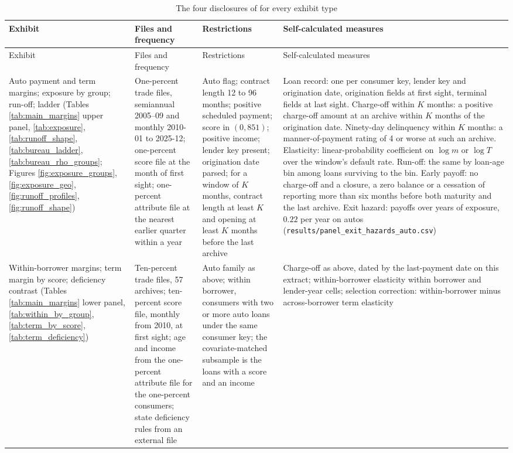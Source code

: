 \begingroup
\footnotesize
{}
\begin{longtable}{@{}>{\raggedright\arraybackslash}p{2.5cm}>{\raggedright\arraybackslash}p{3.5cm}>{\raggedright\arraybackslash}p{3.6cm}>{\raggedright\arraybackslash}p{5.2cm}@{}}
\caption{The four disclosures of \citet[Section 3.1]{gibbs_consumer_2025} for every exhibit type}\label{tab:data_four}\\
\toprule
Exhibit & Files and frequency & Restrictions & Self-calculated measures \\
\midrule
\endfirsthead
\toprule
Exhibit & Files and frequency & Restrictions & Self-calculated measures \\
\midrule
\endhead
\bottomrule
\endfoot
Auto payment and term margins; exposure by group; run-off; ladder (Tables \ref{tab:main_margins} upper panel, \ref{tab:exposure}, \ref{tab:runoff_shape}, \ref{tab:bureau_ladder}, \ref{tab:bureau_rho_groups}; Figures \ref{fig:exposure_groups}, \ref{fig:exposure_geo}, \ref{fig:runoff_profiles}, \ref{fig:runoff_shape}) & One-percent trade files, semiannual 2005--09 and monthly 2010-01 to 2025-12; one-percent score file at the month of first sight; one-percent attribute file at the nearest earlier quarter within a year & Auto flag; contract length 12 to 96 months; positive scheduled payment; score in $(0, 851)$; positive income; lender key present; origination date parsed; for a window of $K$ months, contract length at least $K$ and opening at least $K$ months before the last archive & Loan record: one per consumer key, lender key and origination date, origination fields at first sight, terminal fields at last sight. Charge-off within $K$ months: a positive charge-off amount at an archive within $K$ months of the origination date. Ninety-day delinquency within $K$ months: a manner-of-payment rating of 4 or worse at such an archive. Elasticity: linear-probability coefficient on $\log m$ or $\log T$ over the window's default rate. Run-off: the same by loan-age bin among loans surviving to the bin. Early payoff: no charge-off and a closure, a zero balance or a cessation of reporting more than six months before both maturity and the last archive. Exit hazard: payoffs over years of exposure, $0.22$ per year on autos (\texttt{results/panel\_exit\_hazards\_auto.csv}) \\
Within-borrower margins; term margin by score; deficiency contrast (Tables \ref{tab:main_margins} lower panel, \ref{tab:within_by_group}, \ref{tab:term_by_score}, \ref{tab:term_deficiency}) & Ten-percent trade files, 57 archives; ten-percent score file, monthly from 2010, at first sight; age and income from the one-percent attribute file for the one-percent consumers; state deficiency rules from an external file & Auto family as above; within borrower, consumers with two or more auto loans under the same consumer key; the covariate-matched subsample is the loans with a score and an income & Charge-off as above, dated by the last-payment date on this extract; within-borrower elasticity within borrower and lender-year cells; selection correction: within-borrower minus across-borrower term elasticity \\

\end{longtable}
